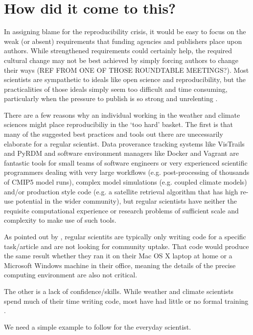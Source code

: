 \section{How did it come to this?}

In assigning blame for the reproducibility crisis, it would be easy to focus on the weak (or absent) requirements that funding agencies and publishers place upon authors. While strengthened requirements could certainly help, the required cultural change may not be best achieved by simply forcing authors to change their ways (REF FROM ONE OF THOSE ROUNDTABLE MEETINGS?). Most scientists are sympathetic to ideals like open science and reproducibility, but the practicalities of those ideals simply seem too difficult and time consuming, particularly when the pressure to publish is so strong and unrelenting \citep{Stodden2010}. 

There are a few reasons why an individual working in the weather and climate sciences might place reproducibiliy in the `too hard' basket. The first is that many of the suggested best practices and tools out there are unecessarily elaborate for a regular scientist. Data proverance tracking systems like VisTrails \citep{Freire2012} and PyRDM \citep{Jacobs2014} and software environment managers like Docker and Vagrant \citep{Stodden2014} are fantastic tools for small teams of software engineers or very experienced scientific programmers dealing with very large workflows (e.g. post-processing of thousands of CMIP5 model runs), complex model simulations (e.g. coupled climate models) and/or production style code (e.g. a satellite retrieval algorithm that has high re-use potential in the wider community), but regular scientists have neither the requisite computational experience or research problems of sufficient scale and complexity to make use of such tools.      

As pointed out by \citet{Easterbrook2014}, regular scientits are typically only writing code for a specific task/article and are not looking for community uptake. That code would produce the same result whether they ran it on their Mac OS X laptop at home or a Microsoft Windows machine in their office, meaning the details of the precise computing environment are also not critical.

The other is a lack of confidence/skills. While weather and climate scientists spend much of their time writing code, most have had little or no formal training \citet{Hannay2009}.   


We need a simple example to follow for the everyday scientist.